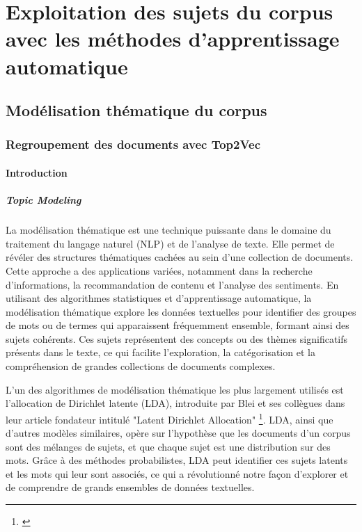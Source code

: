 \part{Exploitation des sujets du corpus avec les méthodes d'apprentissage automatique}

\chapter{Modélisation thématique du corpus}

\section{Regroupement des documents avec Top2Vec}

\subsection{Introduction}
\subsubsection{Topic Modeling}
La modélisation thématique est une technique puissante dans le domaine du traitement du langage naturel (NLP) et de l'analyse de texte. Elle permet de révéler des structures thématiques cachées au sein d'une collection de documents. Cette approche a des applications variées, notamment dans la recherche d'informations, la recommandation de contenu et l'analyse des sentiments.
En utilisant des algorithmes statistiques et d'apprentissage automatique, la modélisation thématique explore les données textuelles pour identifier des groupes de mots ou de termes qui apparaissent fréquemment ensemble, formant ainsi des sujets cohérents. Ces sujets représentent des concepts ou des thèmes significatifs présents dans le texte, ce qui facilite l'exploration, la catégorisation et la compréhension de grandes collections de documents complexes. 

L'un des algorithmes de modélisation thématique les plus largement utilisés est l'allocation de Dirichlet latente (LDA), introduite par Blei et ses collègues dans leur article fondateur intitulé "Latent Dirichlet Allocation" \footnote{\cite{blei2003latent}}. LDA, ainsi que d'autres modèles similaires, opère sur l'hypothèse que les documents d'un corpus sont des mélanges de sujets, et que chaque sujet est une distribution sur des mots. Grâce à des méthodes probabilistes, LDA peut identifier ces sujets latents et les mots qui leur sont associés, ce qui a révolutionné notre façon d'explorer et de comprendre de grands ensembles de données textuelles.

